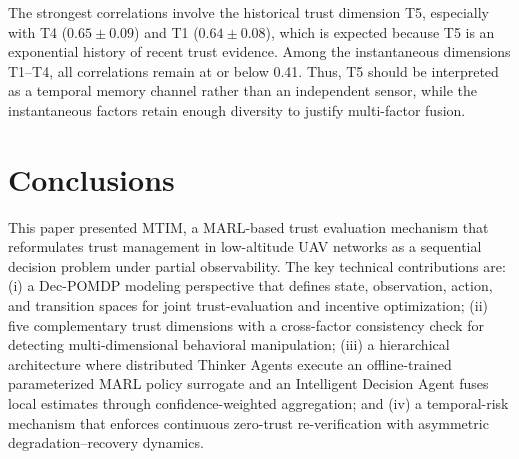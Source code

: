 \documentclass[notspecified,article,submit,moreauthors]{Definitions/mdpi}
\begin{document}
\begin{table}[!htbp]
  \centering
  \caption{Pairwise Pearson correlations among the five trust dimensions (mean $\pm$ std over 50 trials).}
  \label{tab:correlation}
  \footnotesize
\end{table}

The strongest correlations involve the historical trust dimension T5, especially with T4 ($0.65 \pm 0.09$) and T1 ($0.64 \pm 0.08$), which is expected because T5 is an exponential history of recent trust evidence. Among the instantaneous dimensions T1--T4, all correlations remain at or below 0.41. Thus, T5 should be interpreted as a temporal memory channel rather than an independent sensor, while the instantaneous factors retain enough diversity to justify multi-factor fusion.

\section{Conclusions}
\label{sec:conclusions}

This paper presented MTIM, a MARL-based trust evaluation mechanism that reformulates trust management in low-altitude UAV networks as a sequential decision problem under partial observability. The key technical contributions are: (i) a Dec-POMDP modeling perspective that defines state, observation, action, and transition spaces for joint trust-evaluation and incentive optimization; (ii) five complementary trust dimensions with a cross-factor consistency check for detecting multi-dimensional behavioral manipulation; (iii) a hierarchical architecture where distributed Thinker Agents execute an offline-trained parameterized MARL policy surrogate and an Intelligent Decision Agent fuses local estimates through confidence-weighted aggregation; and (iv) a temporal-risk mechanism that enforces continuous zero-trust re-verification with asymmetric degradation--recovery dynamics.
\end{document}

